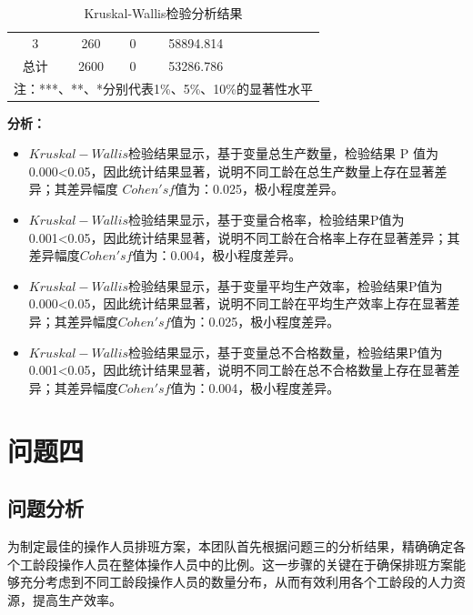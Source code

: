 \documentclass[withoutpreface,bwprint]{cumcmthesis}
\begin{document}
\begin{table}[htbp]
{\begin{tabular}{cccccccc}
    3            & 260           & 0            & 58894.814    &              &              &            &                     \\
    总计           & 2600          & 0            & 53286.786    &              &              &            &                     \\ \midrule
    \multicolumn{8}{c}{注：***、**、*分别代表1\%、5\%、10\%的显著性水平}                                                                           \\ \bottomrule
    \end{tabular}
  }
  \caption{Kruskal-Wallis检验分析结果}
  \label{tab:kruskal-wallis}
\end{table}

\newpage
\textbf{分析：}

\begin{itemize}

    \item \(Kruskal-Wallis\)检验结果显示，基于变量总生产数量，检验结果 P 值为 0.000<0.05，因此统计结果显著，说明不同工龄在总生产数量上存在显著差异；其差异幅度 \(Cohen's f\)值为：0.025，极小程度差异。 
    
    \item \(Kruskal-Wallis\)检验结果显示，基于变量合格率，检验结果P值为0.001<0.05，因此统计结果显著，说明不同工龄在合格率上存在显著差异；其差异幅度\(Cohen's f\)值为：0.004，极小程度差异。  

    \item \(Kruskal-Wallis\)检验结果显示，基于变量平均生产效率，检验结果P值为0.000<0.05，因此统计结果显著，说明不同工龄在平均生产效率上存在显著差异；其差异幅度\(Cohen's f\)值为：0.025，极小程度差异。 

    \item \(Kruskal-Wallis\)检验结果显示，基于变量总不合格数量，检验结果P值为0.001<0.05，因此统计结果显著，说明不同工龄在总不合格数量上存在显著差异；其差异幅度\(Cohen's f\)值为：0.004，极小程度差异。  
 
\end{itemize}


\newpage
\section{问题四}

\subsection{问题分析}
为制定最佳的操作人员排班方案，本团队首先根据问题三的分析结果，精确确定各个工龄段操作人员在整体操作人员中的比例。这一步骤的关键在于确保排班方案能够充分考虑到不同工龄段操作人员的数量分布，从而有效利用各个工龄段的人力资源，提高生产效率。
\end{document}
